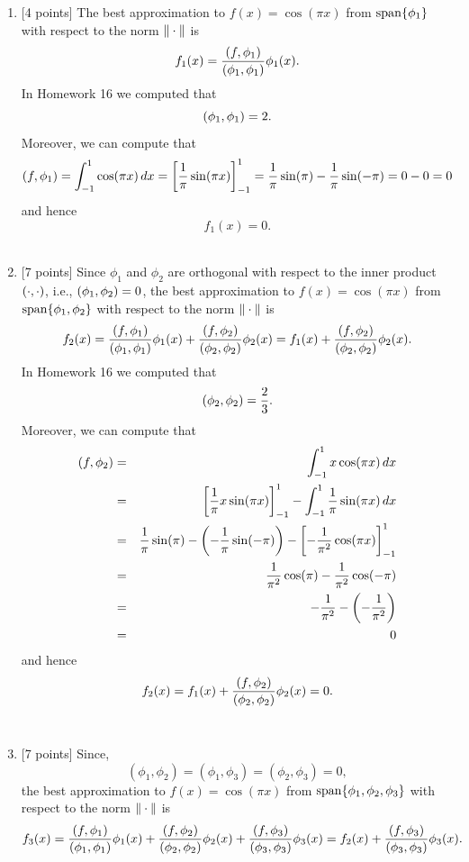 \begin{solution}
\begin{enumerate}
\item {[4 points]} The best approximation to $f(x) = \cos(\pi x)$ from ${\rm span}\{\phi_1\}$ with respect to the norm $\|\cdot\|$ is
       \[ f_1(x) = {(f,\phi_1) \over (\phi_1, \phi_1)} \phi_1(x).\]
In Homework 16 we computed that
\[
          (\phi_1,\phi_1) =2.
\]
Moreover, we can compute that
\[
          (f,\phi_1) = \int_{-1}^1 \cos(\pi x)\,dx = \left[\frac{1}{\pi}\sin(\pi x)\right]_{-1}^1=\frac{1}{\pi}\sin(\pi)-\frac{1}{\pi}\sin(-\pi)=0-0=0
\]
and hence
       \[ f_1(x) = 0.\]
\\
\item {[7 points]} Since $\phi_1$ and $\phi_2$ are
      orthogonal with respect to the inner product $(\cdot,\cdot)$, i.e., $(\phi_1, \phi_2) = 0$, the best approximation to $f(x) = \cos(\pi x)$ from ${\rm span}\{\phi_1,\phi_2\}$ with respect to the norm $\|\cdot\|$ is
       \[ f_2(x) = {(f,\phi_1) \over (\phi_1, \phi_1)} \phi_1(x) + {(f,\phi_2) \over (\phi_2, \phi_2)} \phi_2(x) = f_1(x) + {(f,\phi_2) \over (\phi_2, \phi_2)} \phi_2(x).\]
In Homework 16 we computed that
      \[
         (\phi_2,\phi_2) = {2\over 3}.
\]
Moreover, we can compute that
\begin{eqnarray*}
(f,\phi_2) &=&\int_{-1}^1 x\cos(\pi x)\,dx 
\\
&=&\left[\frac{1}{\pi}x\sin(\pi x)\right]_{-1}^1-\int_{-1}^1 \frac{1}{\pi}\sin(\pi x)\,dx 
\\
&=& \frac{1}{\pi}\sin(\pi)-\left(-\frac{1}{\pi}\sin(-\pi)\right)-\left[-\frac{1}{\pi^2}\cos(\pi x)\right]_{-1}^1 
\\
&=& \frac{1}{\pi^2}\cos(\pi)-\frac{1}{\pi^2}\cos(-\pi)
\\
&=&-\frac{1}{\pi^2}-\left(-\frac{1}{\pi^2}\right)
\\
&=&0
\end{eqnarray*}
and hence
       \[ f_2(x) = f_1(x)
                  + {(f,\phi_2) \over (\phi_2, \phi_2)} \phi_2(x) = 0.\]
\\
\item {[7 points]}
Since,
 \[ (\phi_1,\phi_2) = (\phi_1,\phi_3) = (\phi_2,\phi_3) = 0,\]
the best approximation to $f(x) = \cos(\pi x)$ from ${\rm span}\{\phi_1,\phi_2,\phi_3\}$ with respect to the norm $\|\cdot\|$ is
       \[ f_3(x) = {(f,\phi_1) \over (\phi_1, \phi_1)} \phi_1(x) + {(f,\phi_2) \over (\phi_2, \phi_2)} \phi_2(x) + {(f,\phi_3) \over (\phi_3, \phi_3)} \phi_3(x) = f_2(x) + {(f,\phi_3) \over (\phi_3, \phi_3)} \phi_3(x).\]

\end{enumerate}
\end{solution}
